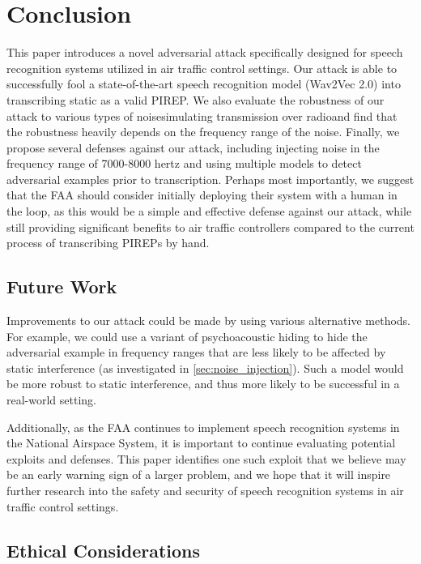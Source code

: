 \documentclass[11pt,a4paper]{article}
\begin{document}
\section{Conclusion}

This paper introduces a novel adversarial attack specifically designed for speech
recognition systems utilized in air traffic control settings. Our attack is able to
successfully fool a state-of-the-art speech recognition model (Wav2Vec 2.0) into
transcribing static as a valid PIREP. We also evaluate the robustness of our
attack to various types of noise\textemdash simulating transmission over
radio\textemdash and find that the robustness heavily depends on the frequency
range of the noise. Finally, we propose several defenses against our attack,
including injecting noise in the frequency range of 7000-8000 hertz and using
multiple models to detect adversarial examples prior to transcription. Perhaps
most importantly, we suggest that the FAA should consider initially deploying
their system with a human in the loop, as this would be a simple and effective
defense against our attack, while still providing significant benefits to air
traffic controllers compared to the current process of transcribing PIREPs by
hand.

\subsection{Future Work}

Improvements to our attack could be made by using various alternative methods.
For example, we could use a variant of psychoacoustic hiding
\cite{schonherr2018adversarial} to hide the adversarial example in frequency
ranges that are less likely to be affected by static interference (as
investigated in \autoref{sec:noise_injection}). Such a model would be more
robust to static interference, and thus more likely to be successful in a
real-world setting.

Additionally, as the FAA continues to implement speech recognition systems in
the National Airspace System, it is important to continue evaluating potential
exploits and defenses. This paper identifies one such exploit that we believe
may be an early warning sign of a larger problem, and we hope that it will
inspire further research into the safety and security of speech recognition
systems in air traffic control settings.

\subsection{Ethical Considerations}
\end{document}
